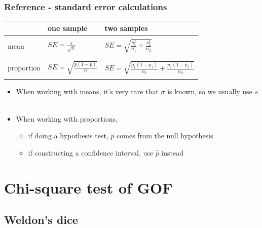 \documentclass[notes,11pt, aspectratio=169]{beamer}
\begin{document}
\begin{frame}
\frametitle{Reference - standard error calculations}

\begin{center}
\begin{tabular}{l | l | l}
			& one sample					& two samples \\ 
\hline
& & \\
mean		& $SE = \frac{s}{\sqrt{n}}$			& $SE = \sqrt{ \frac{s_1^2}{n_1} + \frac{s_2^2}{n_2}}$ \\
& & \\
\hline
& & \\
proportion		& $SE = \sqrt{ \frac{p(1-p)}{n} }$	& $SE = \sqrt{ \frac{p_1(1-p_1)}{n_1} + \frac{p_2(1-p_2)}{n_2} }$	 \\	
& & \\
\end{tabular}
\end{center}

\pause

\begin{itemize}

\item When working with means, it's very rare that $\sigma$ is known, so we usually use $s$.

\pause

\item When working with proportions, 
\begin{itemize}
\item if doing a hypothesis test, $p$ comes from the null hypothesis
\item if constructing a confidence interval, use $\hat{p}$ instead
\end{itemize}

\end{itemize}

\end{frame}



\section{Chi-square test of GOF}


\subsection{Weldon's dice}
\end{document}

